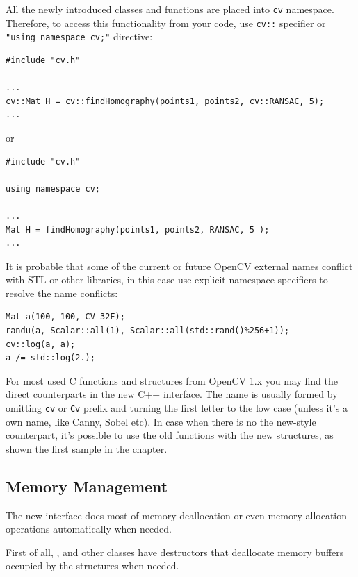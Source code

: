All the newly introduced classes and functions are placed into \texttt{cv} namespace. Therefore, to access this functionality from your code, use \texttt{cv::} specifier or \texttt{"using namespace cv;"} directive:
\begin{lstlisting}
#include "cv.h"

...
cv::Mat H = cv::findHomography(points1, points2, cv::RANSAC, 5);
...
\end{lstlisting}
or
\begin{lstlisting}
#include "cv.h"

using namespace cv;

...
Mat H = findHomography(points1, points2, RANSAC, 5 );
...
\end{lstlisting}

It is probable that some of the current or future OpenCV external names conflict with STL
or other libraries, in this case use explicit namespace specifiers to resolve the name conflicts:
\begin{lstlisting}
Mat a(100, 100, CV_32F);
randu(a, Scalar::all(1), Scalar::all(std::rand()%256+1));
cv::log(a, a);
a /= std::log(2.);
\end{lstlisting}

For most used C functions and structures from OpenCV 1.x you may find the direct counterparts in the new C++ interface. The name is usually formed by omitting \texttt{cv} or \texttt{Cv} prefix and turning the first letter to the low case (unless it's a own name, like Canny, Sobel etc). In case when there is no the new-style counterpart, it's possible to use the old functions with the new structures, as shown the first sample in the chapter.

\subsection{Memory Management}

The new interface does most of memory deallocation or even memory allocation operations automatically when needed.

First of all, ,  and other classes have destructors
that deallocate memory buffers occupied by the structures when needed.

